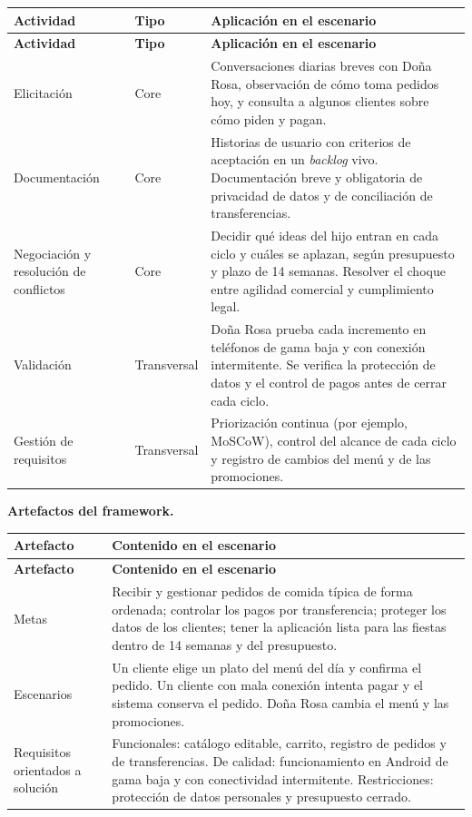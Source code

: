 {\small
\setlength{\tabcolsep}{4pt}
\renewcommand{\arraystretch}{1.3}
\begin{longtable}{
|>{\raggedright\arraybackslash}p{}
|>{\raggedright\arraybackslash}p{}
|>{\raggedright\arraybackslash}p{}|}
\hline
\textbf{Actividad} & \textbf{Tipo} & \textbf{Aplicación en el escenario} \\
\hline
\endfirsthead
\hline
\textbf{Actividad} & \textbf{Tipo} & \textbf{Aplicación en el escenario} \\
\hline
\endhead
Elicitación & Core & Conversaciones diarias breves con Doña Rosa, observación de cómo toma pedidos hoy, y consulta a algunos clientes sobre cómo piden y pagan. \\
\hline
Documentación & Core & Historias de usuario con criterios de aceptación en un \textit{backlog} vivo. Documentación breve y obligatoria de privacidad de datos y de conciliación de transferencias. \\
\hline
Negociación y resolución de conflictos & Core & Decidir qué ideas del hijo entran en cada ciclo y cuáles se aplazan, según presupuesto y plazo de 14 semanas. Resolver el choque entre agilidad comercial y cumplimiento legal. \\
\hline
Validación & Transversal & Doña Rosa prueba cada incremento en teléfonos de gama baja y con conexión intermitente. Se verifica la protección de datos y el control de pagos antes de cerrar cada ciclo. \\
\hline
Gestión de requisitos & Transversal & Priorización continua (por ejemplo, MoSCoW), control del alcance de cada ciclo y registro de cambios del menú y de las promociones. \\
\hline
\end{longtable}
}

\textbf{Artefactos del framework.}

{\small
\setlength{\tabcolsep}{4pt}
\renewcommand{\arraystretch}{1.3}
\begin{longtable}{
|>{\raggedright\arraybackslash}p{}
|>{\raggedright\arraybackslash}p{}|}
\hline
\textbf{Artefacto} & \textbf{Contenido en el escenario} \\
\hline
\endfirsthead
\hline
\textbf{Artefacto} & \textbf{Contenido en el escenario} \\
\hline
\endhead
Metas & Recibir y gestionar pedidos de comida típica de forma ordenada; controlar los pagos por transferencia; proteger los datos de los clientes; tener la aplicación lista para las fiestas dentro de 14 semanas y del presupuesto. \\
\hline
Escenarios & Un cliente elige un plato del menú del día y confirma el pedido. Un cliente con mala conexión intenta pagar y el sistema conserva el pedido. Doña Rosa cambia el menú y las promociones. \\
\hline
Requisitos orientados a solución & Funcionales: catálogo editable, carrito, registro de pedidos y de transferencias. De calidad: funcionamiento en Android de gama baja y con conectividad intermitente. Restricciones: protección de datos personales y presupuesto cerrado. \\
\hline
\end{longtable}
}

